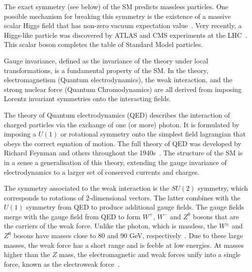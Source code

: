 The exact symmetry (see below) of the SM predicts massless particles.  One possible mechanism for breaking this symmetry is the existence of a massive scalar Higgs field that has non-zero vacuum expectation value~\cite{Higgs1964132}. Very recently, a Higgs-like particle was discovered by ATLAS and CMS experiments at the LHC~\cite{ATLASHiggs}. This scalar boson completes the table of Standard Model particles. %


Gauge invariance, defined as the invariance of the theory under local transformations, is a fundamental property of the SM.  In the theory, electromagnetism (Quantum electrodynamics), the weak interaction, and the strong nuclear force (Quantum Chromodynamics) are all derived from imposing Lorentz invariant symmetries onto the interacting fields. 

The theory of Quantum electrodynamics (QED) describes the interaction of charged particles via the exchange of one (or more) photon. It is formulated by imposing a $U(1)$ or rotational symmetry onto the simplest field lagrangian that obeys the correct equation of motion. The full theory of QED was developed by Richard Feynman and others throughout the 1940s~\cite{PhysRev.75.486}.  The structure of the SM is in a sense a generalisation of this theory, extending the gauge invariance of electrodynamics to a larger set of conserved currents and charges. 

The symmetry associated to the weak interaction is the $SU(2)$ symmetry, which corresponds to rotations of 2-dimensional vectors. The latter combines with the $U(1)$ symmetry from QED to produce additional gauge fields. The gauge fields merge with the gauge field from QED to form $W^+$, $W^-$ and $Z^0$ bosons that are the carriers of the weak force.  Unlike the photon, which is massless, the  $W^{\pm}$ and $Z^0$ bosons have masses close to 80 and 90 GeV, respectively~\cite{Banner1983476,Arnison1983398}. Due to these large masses, the weak force has a short range and is feeble at low energies.  At masses higher than the $Z$ mass, the electromagnetic and weak forces unify into a single force, known as the electroweak force~\cite{Glashow1961579,Salam1964168,PhysRevLett.19.1264}.

